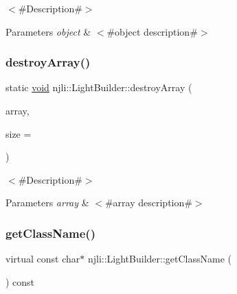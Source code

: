 $<$\#\+Description\#$>$


\begin{DoxyParams}{Parameters}
{\em object} & $<$\#object description\#$>$ \\
\hline
\end{DoxyParams}
\mbox{\label{classnjli_1_1_light_builder_ab16a1e8eed4eb47d0567fd04eb7545ca}} 
\subsubsection{\texorpdfstring{destroy\+Array()}{destroyArray()}}
{\footnotesize\ttfamily static \mbox{\hyperlink{_thread_8h_af1e856da2e658414cb2456cb6f7ebc66}{void}} njli\+::\+Light\+Builder\+::destroy\+Array (\begin{DoxyParamCaption}\item[{\mbox{\hyperlink{classnjli_1_1_light_builder}{Light\+Builder}} $\ast$$\ast$}]{array,  }\item[{const \mbox{\hyperlink{_util_8h_a10e94b422ef0c20dcdec20d31a1f5049}{u32}}}]{size = {} }\end{DoxyParamCaption})\hspace{0.3cm}{\ttfamily [static]}}

$<$\#\+Description\#$>$


\begin{DoxyParams}{Parameters}
{\em array} & $<$\#array description\#$>$ \\
\hline
\end{DoxyParams}
\mbox{\label{classnjli_1_1_light_builder_a43535912e865dfb5e1dd00042a6f7f91}} 
\subsubsection{\texorpdfstring{get\+Class\+Name()}{getClassName()}}
{\footnotesize\ttfamily virtual const char$\ast$ njli\+::\+Light\+Builder\+::get\+Class\+Name (\begin{DoxyParamCaption}{ }\end{DoxyParamCaption}) const\hspace{0.3cm}{\ttfamily [virtual]}}

